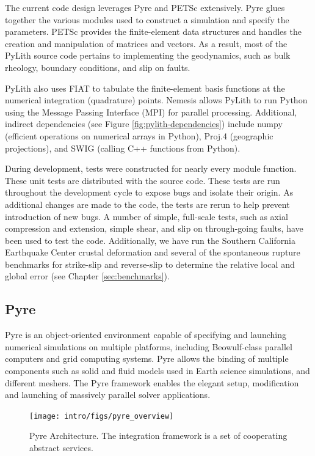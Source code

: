 The current code design leverages Pyre and PETSc extensively. Pyre
glues together the various modules used to construct a simulation and
specify the parameters. PETSc provides the finite-element data
structures and handles the creation and manipulation of matrices and
vectors. As a result, most of the PyLith source code pertains to
implementing the geodynamics, such as bulk rheology, boundary
conditions, and slip on faults.

PyLith also uses FIAT to tabulate the finite-element basis functions
at the numerical integration (quadrature) points. Nemesis allows
PyLith to run Python using the Message Passing Interface (MPI) for
parallel processing. Additional, indirect dependencies (see Figure
\vref{fig:pylith-dependencies}) include numpy (efficient operations on
numerical arrays in Python), Proj.4 (geographic projections), and SWIG
(calling C++ functions from Python).

During development, tests were constructed for nearly every module
function. These unit tests are distributed with the source code. These
tests are run throughout the development cycle to expose bugs and
isolate their origin. As additional changes are made to the code, the
tests are rerun to help prevent introduction of new bugs. A number of
simple, full-scale tests, such as axial compression and extension,
simple shear, and slip on through-going faults, have been used to test
the code. Additionally, we have run the Southern California Earthquake
Center crustal deformation and several of the spontaneous rupture
benchmarks for strike-slip and reverse-slip to determine the relative
local and global error (see Chapter \vref{sec:benchmarks}).

\subsection{Pyre}

Pyre is an object-oriented environment capable of specifying and launching
numerical simulations on multiple platforms, including Beowulf-class
parallel computers and grid computing systems. Pyre allows the binding
of multiple components such as solid and fluid models used in Earth
science simulations, and different meshers. The Pyre framework enables
the elegant setup, modification and launching of massively parallel
solver applications.

\begin{figure}[htbp]
  \texttt{[image: intro/figs/pyre\_overview]}
  \caption{Pyre Architecture. The integration framework is a set of
    cooperating abstract services.}
  \label{fig:Pyre:Architecture}
\end{figure}

